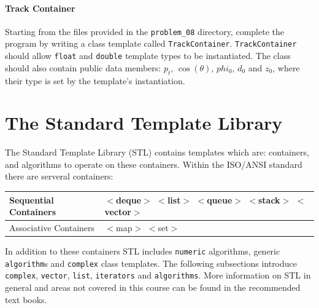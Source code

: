 \documentclass[11pt,a4paper]{scrartcl}
\begin{document}
\paragraph{Track Container}
Starting from the files provided in the \texttt{problem\_08} directory,
complete the program by writing a class template called
\texttt{TrackContainer}.   \texttt{TrackContainer} should allow
\texttt{float} and \texttt{double} template types to be instantiated.
The class should also contain public data members: $p_t$,
$\cos(\theta)$, $phi_0$, $d_0$ and $z_0$, where their type is set by
the template's instantiation.



\section{The Standard Template Library \label{section:stl}}

The Standard Template Library (STL) contains templates which are:
containers, and algorithms to operate on these containers.  Within the
ISO/ANSI standard there are serveral containers:
%
\begin{center}
\begin{tabular}{|l|l|} \hline
Sequential Containers & $<$deque$>$ $<$list$>$ $<$queue$>$
$<$stack$>$ $<$vector$>$\\ \hline
Associative Containers & $<$map$>$ $<$set$>$ \\ \hline
\end{tabular}
\end{center}
%
In addition to these containers STL includes \texttt{numeric}
algorithms, generic \texttt{algorithm}s and \texttt{complex} class
templates.  The following subsections introduce
\texttt{complex}, \texttt{vector}, \texttt{list}, \texttt{iterators}
and \texttt{algorithms}.  More information on STL in general and areas
not covered in this course can be found in the recommended text books.

\end{document}

